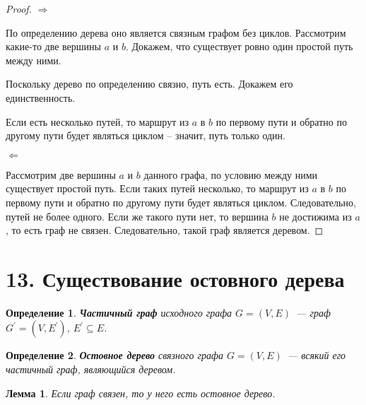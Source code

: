 \documentclass[a4paper,12pt]{article}
\newtheorem*{defin}{Определение}
\newtheorem*{Lemma}{Лемма}
\begin{document}
    \begin{proof}
        \par $\Rightarrow$
        \par По определению дерева оно является связным графом без циклов.
        Рассмотрим какие-то две вершины $a$ и $b$. Докажем, что существует
        ровно один простой путь между ними.
        \par Поскольку дерево по определению связно, путь есть. Докажем его
        единственность.
        \par Если есть несколько путей, то маршрут из $a$ в $b$ по первому пути
        и обратно по другому пути будет являться циклом -- значит, путь только
        один.

        \par $\Leftarrow$
        \par Рассмотрим две вершины $a$ и $b$ данного графа, по условию между
        ними существует простой путь. Если таких путей несколько, то маршрут из
        $a$ в $b$ по первому пути и обратно по другому пути будет являться
        циклом. Следовательно, путей не более одного. Если же такого пути нет,
        то вершина $b$ не достижима из $a$, то есть граф не связен.
        Следовательно, такой граф является деревом.
    \end{proof}

 	\section*{13. Существование остовного дерева}
 	\begin{defin} \textbf{Частичный граф} исходного графа 
 		$G = (V, E)$ — граф $G^{\prime} = (V, E^{\prime})$, $E^{\prime} \subseteq E$.
	\end{defin}

	\begin{defin} \textbf{Остовное дерево} связного графа $G = (V, E)$ — всякий его частичный граф, являющийся деревом.
	\end{defin}

	\begin{Lemma} 
		Если граф связен, то у него есть остовное дерево. 
	\end{Lemma}
\end{document}
